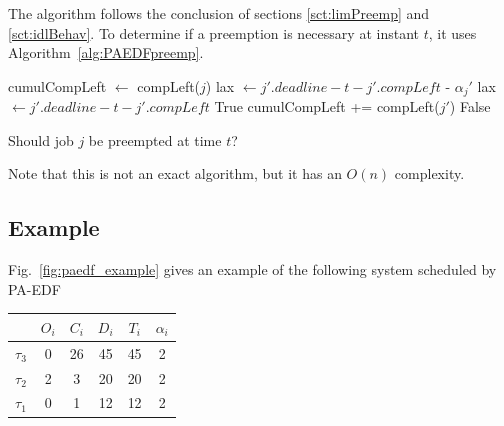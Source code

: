 \documentclass[a4paper,10pt]{article}
\begin{document}
        The algorithm follows the conclusion of sections \ref{sct:limPreemp} and \ref{sct:idlBehav}. To determine if a preemption is necessary at instant $t$, it uses Algorithm~\ref{alg:PAEDFpreemp}.

        \begin{algorithm}[H]
            \begin{algorithmic}[1]
            \STATE cumulCompLeft $\leftarrow$ compLeft($j$)
                    \STATE lax $\leftarrow j'.deadline - t - j'.compLeft$ - $\alpha_j'$
                \ELSE
                    \STATE lax $\leftarrow j'.deadline - t - j'.compLeft$
                \ENDIF
                    \RETURN True
                \ELSE
                    \STATE cumulCompLeft += compLeft($j'$)
                \ENDIF
            \ENDFOR
            \RETURN False
            \end{algorithmic}
                \caption{Should job $j$ be preempted at time $t$?}
                \label{alg:PAEDFpreemp}
            \end{algorithm}

        Note that this is not an exact algorithm, but it has an $O(n)$ complexity.\\

    \subsection{Example}

        Fig.~\ref{fig:paedf_example} gives an example of the following system scheduled by PA-EDF

        \begin{center}
            \begin{tabular}{|r|c|c|c|c|c|}
                \hline
                            & $O_i$ & $C_i$ & $D_i$ & $T_i$ & $\alpha_i$ \\ \hline
                $\tau_3$    & 0     & 26    & 45    & 45    & 2     \\ \hline
                $\tau_2$    & 2     & 3     & 20    & 20    & 2     \\ \hline
                $\tau_1$    & 0     & 1     & 12    & 12    & 2     \\ \hline
            \end{tabular}
        \end{center}
\end{document}
